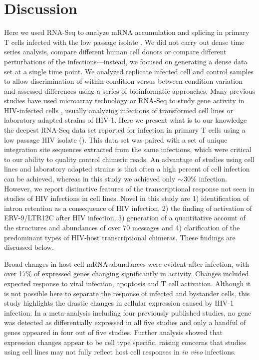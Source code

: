\documentclass[../sherrill-Mix_thesis.tex]{subfiles}
\begin{document}
\section{Discussion}
	Here we used RNA-Seq to analyze mRNA accumulation and splicing in primary T cells infected with the low passage isolate \hivEight{}.  We did not carry out dense time series analysis, compare different human cell donors or compare different perturbations of the infections---instead, we focused on generating a dense data set at a single time point.  We analyzed replicate infected cell and control samples to allow discrimination of within-condition versus between-condition variation and assessed differences using a series of bioinformatic approaches. Many previous studies have used microarray technology or RNA-Seq to study gene activity in HIV-infected cells \citep{Corbeil2001,delaFuente2002,Mitchell2003,Woelk2004,Hyrcza2007,Wu2008,Smith2010,Chang2011,Lefebvre2011,Imbeault2012,Mohammadi2013,Peng2014}, usually analyzing infections of transformed cell lines or laboratory adapted strains of HIV-1. Here we present what is to our knowledge the deepest RNA-Seq data set reported for infection in primary T cells using a low passage HIV isolate (\hivEight{}). This data set was paired with a set of \nIntegrations{} unique integration site sequences extracted from the same infections, which were critical to our ability to quality control chimeric reads. An advantage of studies using cell lines and laboratory adapted strains is that often a high percent of cell infection can be achieved, whereas in this study we achieved only $\mathord{\sim}$30\% infection.  However, we report distinctive features of the transcriptional response not seen in studies of HIV infections in cell lines.  Novel in this study are 1) identification of intron retention as a consequence of HIV infection, 2) the finding of activation of ERV-9/LTR12C after HIV infection,  3) generation of a quantitative account of the structures and abundances of over 70 \hivEight{} messages and 4) clarification of the predominant types of HIV-host transcriptional chimeras.  These findings are discussed below.

	Broad changes in host cell mRNA abundances were evident after infection, with over 17\% of expressed genes changing significantly in activity. Changes included expected response to viral infection, apoptosis and T cell activation. Although it is not possible here to separate the response of infected and bystander cells, this study highlights the drastic changes in cellular expression caused by HIV-1 infection. In a meta-analysis including four previously published studies, no gene was detected as differentially expressed in all five studies and only a handful of genes appeared in four out of five studies. Further analysis showed that expression changes appear to be cell type specific, raising concerns that studies using cell lines may not fully reflect host cell responses in \emph{in vivo} infections. 
\end{document}
